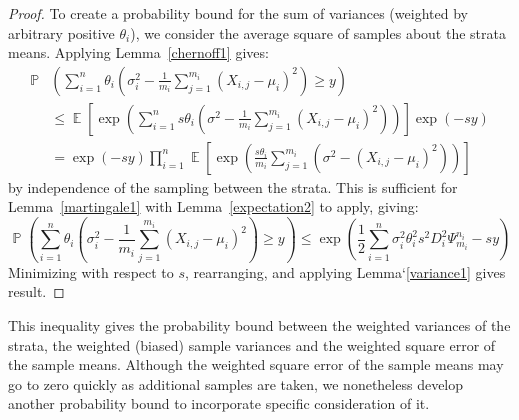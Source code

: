 \documentclass[]{interact}
\DeclareMathOperator{\E}{\mathbb{E}}
\DeclareMathOperator{\pr}{\mathbb{P}}
\theoremstyle{plain}%
\theoremstyle{definition}
\theoremstyle{remark}
\begin{document}
\begin{proof}
To create a probability bound for the sum of variances (weighted by arbitrary positive $\theta_i$), we consider the average square of samples about the strata means. 
Applying Lemma~\ref{chernoff1} gives:
\begin{align*} 
\pr&\left(\sum_{i=1}^n\theta_i(\sigma_i^2-\frac{1}{m_i}\sum_{j=1}^{m_i}(X_{i,j}-\mu_i)^2)\ge y\right) \\
&\le \E\left[\exp\left(\sum_{i=1}^ns\theta_i\left(\sigma^2-\frac{1}{m_i}\sum_{j=1}^{m_i}(X_{i,j}-\mu_i)^2\right)\right)\right]\exp(-sy)\\
& = \exp(-sy)\prod_{i=1}^n\E\left[\exp\left(\frac{s\theta_i}{m_i}\sum_{j=1}^{m_i}(\sigma^2-(X_{i,j}-\mu_i)^2)\right)\right] 
\end{align*}
by independence of the sampling between the strata. 
This is sufficient for Lemma~\ref{martingale1} with Lemma~\ref{expectation2} to apply, giving:
$$ \pr\left(\sum_{i=1}^n\theta_i(\sigma_i^2-\frac{1}{m_i}\sum_{j=1}^{m_i}(X_{i,j}-\mu_i)^2)\ge y\right) \le \exp\left(\frac{1}{2}\sum_{i=1}^n\sigma_i^2\theta_i^2s^2D_i^2\Psi_{m_i}^{n_i}-sy\right)$$
Minimizing with respect to $s$, rearranging, and applying Lemma`\ref{variance1} gives result.
\end{proof}

This inequality gives the probability bound between the weighted variances of the strata, 
the weighted (biased) sample variances 
and the weighted square error of the sample means.
Although the weighted square error of the sample means may go to zero quickly as additional samples are taken, we nonetheless develop another probability bound to incorporate specific consideration of it.
\end{document}
